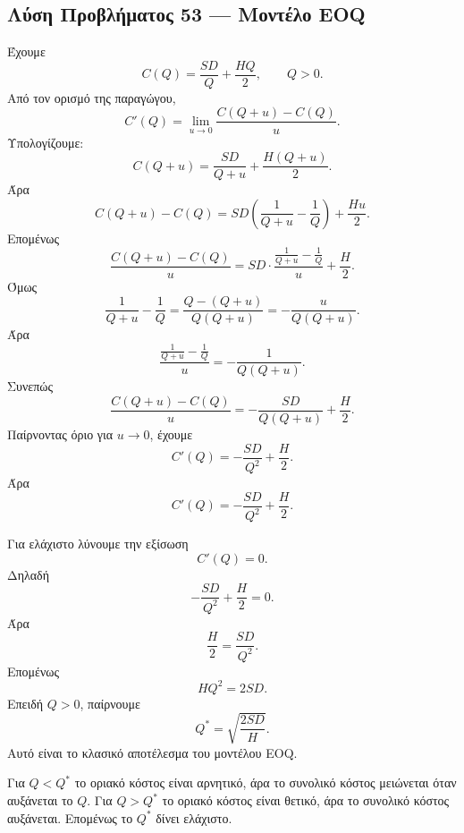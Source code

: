 \subsection*{Λύση Προβλήματος 53 --- Μοντέλο EOQ}

\begin{alist}
  \item Έχουμε
        \[
          C(Q)=\frac{SD}{Q}+\frac{HQ}{2},
          \qquad Q>0.
        \]
        Από τον ορισμό της παραγώγου,
        \[
          C'(Q)
          =
          \lim_{u\to0}
          \frac{C(Q+u)-C(Q)}{u}.
        \]
        Υπολογίζουμε:
        \[
          C(Q+u)
          =
          \frac{SD}{Q+u}+\frac{H(Q+u)}{2}.
        \]
        Άρα
        \[
          C(Q+u)-C(Q)
          =
          SD\left(\frac{1}{Q+u}-\frac{1}{Q}\right)
          +\frac{Hu}{2}.
        \]
        Επομένως
        \[
          \frac{C(Q+u)-C(Q)}{u}
          =
          SD\cdot
          \frac{\frac{1}{Q+u}-\frac{1}{Q}}{u}
          +\frac{H}{2}.
        \]
        Όμως
        \[
          \frac{1}{Q+u}-\frac{1}{Q}
          =
          \frac{Q-(Q+u)}{Q(Q+u)}
          =
          -\frac{u}{Q(Q+u)}.
        \]
        Άρα
        \[
          \frac{\frac{1}{Q+u}-\frac{1}{Q}}{u}
          =
          -\frac{1}{Q(Q+u)}.
        \]
        Συνεπώς
        \[
          \frac{C(Q+u)-C(Q)}{u}
          =
          -\frac{SD}{Q(Q+u)}+\frac{H}{2}.
        \]
        Παίρνοντας όριο για \(u\to0\), έχουμε
        \[
          C'(Q)
          =
          -\frac{SD}{Q^2}+\frac{H}{2}.
        \]
        Άρα
        \[
          {
          C'(Q)=-\frac{SD}{Q^2}+\frac{H}{2}
          }.
        \]

  \item Για ελάχιστο λύνουμε την εξίσωση
        \[
          C'(Q)=0.
        \]
        Δηλαδή
        \[
          -\frac{SD}{Q^2}+\frac{H}{2}=0.
        \]
        Άρα
        \[
          \frac{H}{2}=\frac{SD}{Q^2}.
        \]
        Επομένως
        \[
          HQ^2=2SD.
        \]
        Επειδή \(Q>0\), παίρνουμε
        \[
          {
          Q^*=\sqrt{\frac{2SD}{H}}
          }.
        \]
        Αυτό είναι το κλασικό αποτέλεσμα του μοντέλου EOQ.

        Για \(Q<Q^*\) το οριακό κόστος είναι αρνητικό, άρα το συνολικό
        κόστος μειώνεται όταν αυξάνεται το \(Q\). Για \(Q>Q^*\) το
        οριακό κόστος είναι θετικό, άρα το συνολικό κόστος αυξάνεται.
        Επομένως το \(Q^*\) δίνει ελάχιστο.


\end{alist}
